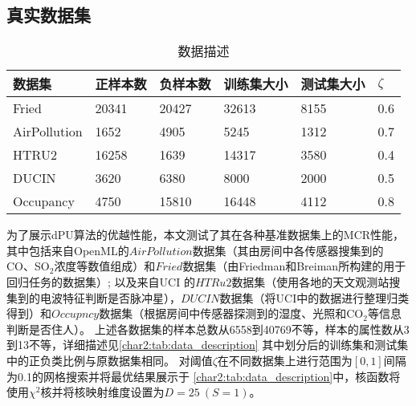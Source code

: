 \subsection{真实数据集}
\begin{table}[htbp]
    \caption{\label{char2:tab:data_description}数据描述}
    \begin{tabularx}{\textwidth}{XXXXXX}
        \hline
        数据集  & 正样本数 & 负样本数 & 训练集大小 & 测试集大小 & $\zeta$ \\ \hline
        Fried  & 20341 & 20427 & 32613 & 8155 &  0.6\\
        AirPollution & 1652 & 4905 & 5245 & 1312 &  0.7\\
        HTRU2 & 16258 & 1639 & 14317 & 3580  & 0.4\\
        DUCIN & 3620 & 6380 & 8000 & 2000 &  0.5\\
        Occupancy & 4750 & 15810 & 16448 & 4112 &  0.8\\ \hline
    \end{tabularx}
\end{table}
为了展示dPU算法的优越性能，本文测试了其在各种基准数据集上的MCR性能，其中包括来自OpenML\cite{OpenML}的$AirPollution$数据集（其由房间中各传感器搜集到的CO、SO$_2$浓度等数值组成）和$Fried$数据集（由Friedman和Breiman所构建的用于回归任务的数据集）;
以及来自UCI \cite{UCI}的$HTRu2$数据集（使用各地的天文观测站搜集到的电波特征判断是否脉冲星），$DUCIN$数据集（将UCI中的数据进行整理归类得到）和$Occupncy$数据集（根据房间中传感器探测到的湿度、光照和CO$_2$等信息判断是否住人）。
上述各数据集的样本总数从6558到40769不等，样本的属性数从3到13不等，详细描述见\autoref{char2:tab:data_description}
其中划分后的训练集和测试集中的正负类比例与原数据集相同。
对阈值$\zeta$在不同数据集上进行范围为$\left[0,1\right]$间隔为0.1的网格搜索并将最优结果展示于
\autoref{char2:tab:data_description}中，核函数将使用$\chi^2$核并将核映射维度设置为$D=25~(S=1)$。

